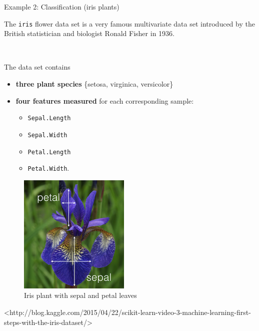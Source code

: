 \documentclass[10pt,ignorenonframetext,]{beamer}
\providecommand{\tightlist}{%
  \setlength{\itemsep}{0pt}\setlength{\parskip}{0pt}}
\begin{document}
\begin{frame}[fragile]{Example 2: Classification (iris plants)}

The \texttt{iris} flower data set is a very famous multivariate data set
introduced by the British statistician and biologist Ronald Fisher in
1936.

\(~\)

The data set contains

\begin{itemize}
\tightlist
\item
  \textbf{three plant species} \{setosa, virginica, versicolor\}
\item
  \textbf{four features measured} for each corresponding sample:

  \begin{itemize}
  \tightlist
  \item
    \texttt{Sepal.Length}
  \item
    \texttt{Sepal.Width}
  \item
    \texttt{Petal.Length}
  \item
    \texttt{Petal.Width}.
  \end{itemize}
\end{itemize}

\end{frame}

\begin{frame}

\begin{figure}
\includegraphics[width=150pt]{iris} \caption{Iris plant with sepal and petal leaves}\label{fig:iris_pic}
\end{figure}

\tiny
<http://blog.kaggle.com/2015/04/22/scikit-learn-video-3-machine-learning-first-steps-with-the-iris-dataset/>

\end{frame}
\end{document}
